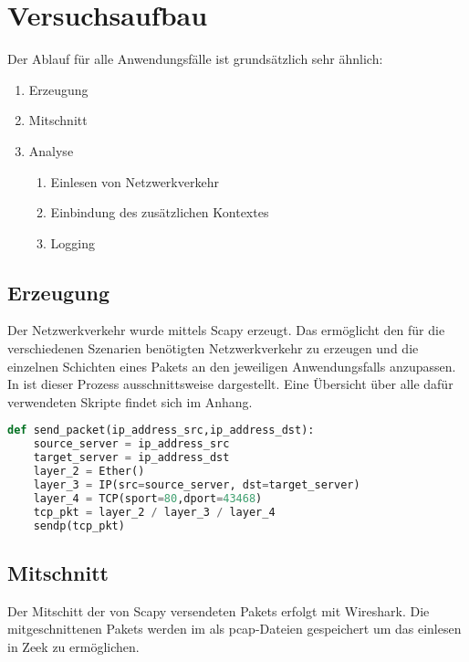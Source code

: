 \section{Versuchsaufbau}
Der Ablauf für alle Anwendungsfälle ist grundsätzlich sehr ähnlich:
\begin{enumerate}
\item{Erzeugung}
\item{Mitschnitt}
\item{Analyse}
\begin{enumerate}
\item{Einlesen von Netzwerkverkehr}
\item{Einbindung des zusätzlichen Kontextes}
\item{Logging}
\end{enumerate}
\end{enumerate}
\subsection{Erzeugung}
Der Netzwerkverkehr wurde mittels Scapy erzeugt. Das ermöglicht den für die verschiedenen Szenarien benötigten Netzwerkverkehr zu erzeugen und die einzelnen Schichten eines Pakets an den jeweiligen Anwendungsfalls anzupassen. In ist dieser Prozess ausschnittsweise dargestellt. Eine Übersicht über alle dafür verwendeten Skripte findet sich im Anhang.
\begin{lstlisting}[language=python,caption={Konfiguration und Versendung eines Pakets},firstnumber=6]
def send_packet(ip_address_src,ip_address_dst):
    source_server = ip_address_src
    target_server = ip_address_dst
    layer_2 = Ether()
    layer_3 = IP(src=source_server, dst=target_server)
    layer_4 = TCP(sport=80,dport=43468)
    tcp_pkt = layer_2 / layer_3 / layer_4
    sendp(tcp_pkt)
\end{lstlisting}
\subsection{Mitschnitt}
Der Mitschitt der von Scapy versendeten Pakets erfolgt mit Wireshark. Die mitgeschnittenen Pakets werden im als pcap-Dateien gespeichert um das einlesen in Zeek zu ermöglichen.


